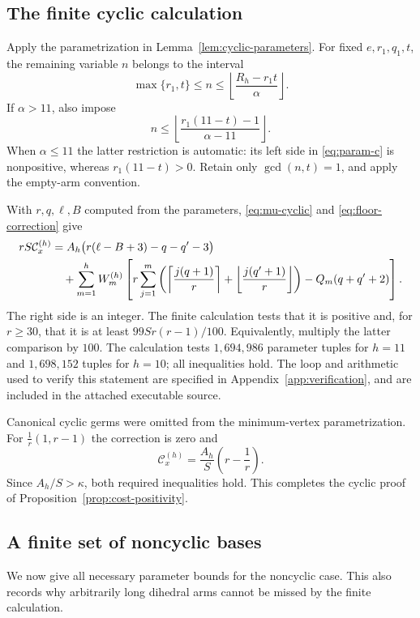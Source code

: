 \documentclass[12pt,a4paper]{article}
\numberwithin{equation}{section}
\theoremstyle{definition}
\newcommand{\ceil}[1]{\left\lceil#1\right\rceil}
\newcommand{\floor}[1]{\left\lfloor#1\right\rfloor}
\newcommand{\cost}{\mathcal C}
\begin{document}
\subsection{The finite cyclic calculation}

Apply the parametrization in Lemma~\ref{lem:cyclic-parameters}.
For fixed \(e,r_1,q_1,t\), the remaining variable \(n\) belongs to
the interval
\begin{equation}\label{eq:n-range}
 \max\{r_1,t\}\leq n\leq
        \floor{\frac{R_h-r_1t}{\alpha}}.
\end{equation}
If \(\alpha>11\), also impose
\[
 n\leq\floor{\frac{r_1(11-t)-1}{\alpha-11}}.
\]
When \(\alpha\leq11\) the latter restriction is automatic:
its left side in \eqref{eq:param-c} is nonpositive, whereas
\(r_1(11-t)>0\).
Retain only \(\gcd(n,t)=1\), and apply the empty-arm convention.

With \(r,q,\ell,B\) computed from the parameters,
\eqref{eq:mu-cyclic} and \eqref{eq:floor-correction} give
\begin{align}
 rS\cost_x^{(h)}
 &=A_h\bigl(r(\ell-B+3)-q-q'-3\bigr)\notag\\
 &\quad+\sum_{m=1}^hW_m^{(h)}
 \left[
 r\sum_{j=1}^m
 \left(\ceil{\frac{j(q+1)}r}+
       \floor{\frac{j(q'+1)}r}\right)
       -Q_m(q+q'+2)\right].\label{eq:integer-cost}
\end{align}
The right side is an integer.
The finite calculation tests that it is positive and, for \(r\geq30\),
that it is at least \(99Sr(r-1)/100\).
Equivalently, multiply the latter comparison by \(100\).
The calculation tests \(1,694,986\) parameter tuples for \(h=11\)
and \(1,698,152\) tuples for \(h=10\); all inequalities hold.
The loop and arithmetic used to verify this statement are specified
in Appendix~\ref{app:verification}, and are included in the
attached executable source.

Canonical cyclic germs were omitted from the minimum-vertex
parametrization. For \(\frac1r(1,r-1)\) the correction is zero and
\[
               \cost_x^{(h)}=\frac{A_h}{S}\left(r-\frac1r\right).
\]
Since \(A_h/S>\kappa\), both required inequalities hold.
This completes the cyclic proof of
Proposition~\ref{prop:cost-positivity}.

\subsection{A finite set of noncyclic bases}

We now give all necessary parameter bounds for the noncyclic case.
This also records why arbitrarily long dihedral arms cannot be
missed by the finite calculation.
\end{document}
